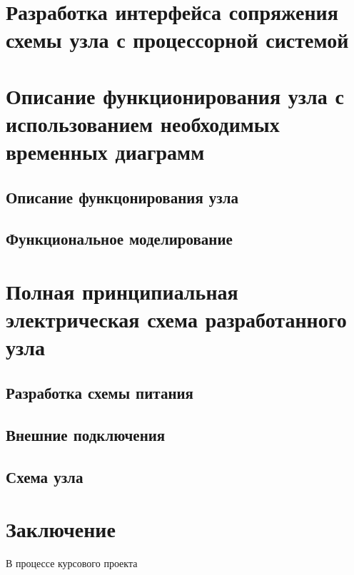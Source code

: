 \documentclass[a4paper,14pt,russian]{article}
\begin{document}
\section{Разработка интерфейса сопряжения схемы узла с процессорной системой}


\section{Описание функционирования узла с использованием необходимых временных диаграмм}
\subsection{Описание функцонирования узла}

\subsection{Функциональное моделирование}


\section{Полная принципиальная электрическая схема разработанного узла}
\subsection{Разработка схемы питания}

\subsection{Внешние подключения}

\subsection{Схема узла}

\section*{Заключение}
В процессе курсового проекта

\renewcommand\refname{Список использованных источников}
\nocite{*}


\clearpage
\appendix
\end{document}
